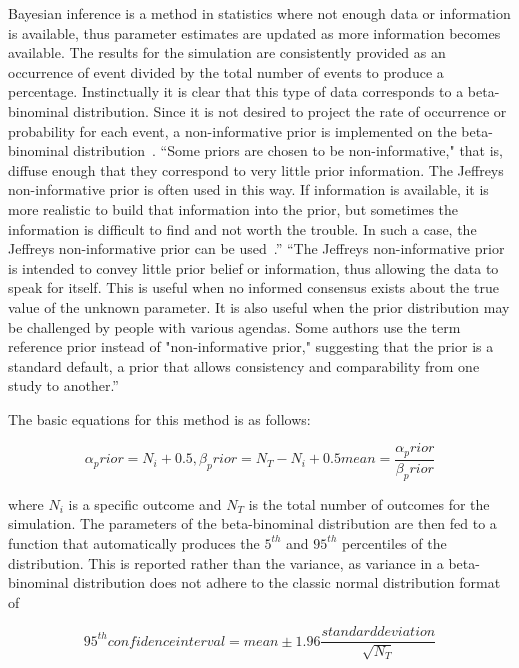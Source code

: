 Bayesian inference is a method in statistics where not enough data or information is 
available, thus parameter estimates are updated as more information becomes available. 
The results for the simulation are consistently provided as an occurrence of event 
divided by the total number of events to produce a percentage. Instinctually it is 
clear that this type of data corresponds to a beta-binominal distribution.  
Since it is not desired to project the rate of occurrence or probability for each event,
 a non-informative prior is implemented on the beta-binominal distribution~\cite{stat}.
``Some priors are chosen to be non-informative," that is, diffuse enough that they correspond 
to very little prior information. The Jeffreys non-informative prior is often used in this way. 
If information is available, it is more realistic to build that information into the prior, 
but sometimes the information is difficult to find and not worth the trouble. 
In such a case, the Jeffreys non-informative prior can be used~\cite{NUREGCR6823}.''
``The Jeffreys non-informative prior is intended to convey little prior belief or information, 
thus allowing the data to speak for itself. This is useful when no informed consensus exists 
about the true value of the unknown parameter. It is also useful when the prior distribution 
may be challenged by people with various agendas. Some authors use the term reference prior 
instead of "non-informative prior," suggesting that the prior is a standard default, a prior 
that allows consistency and comparability from one study to another.''

The basic equations for this method is as follows:

\begin{equation}
  \alpha_prior = N_i + 0.5  ,  \beta_prior = N_T - N_i + 0.5
  mean = \frac{\alpha_prior}{\beta_prior}
  \label{eq:priorDef}
\end{equation}

where $N_i$ is a specific outcome and $N_T$ is the total number of outcomes for the simulation. 
The parameters of the beta-binominal distribution are then fed to a function that automatically 
produces the $5^{th}$ and $95^{th}$ percentiles of the distribution.  This is reported rather than the 
variance, as variance in a beta-binominal distribution does not adhere to the classic normal 
distribution format of 

\begin{equation}
  95^{th} confidence interval = mean \pm 1.96 \frac{standard deviation}{\sqrt{N_T}}
  \label{eq:priorDef}
\end{equation}

